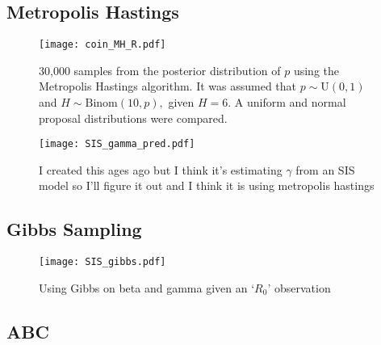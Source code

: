 \subsection*{Metropolis Hastings}

\begin{figure}[htbp]
    \centering
    \texttt{[image: coin\_MH\_R.pdf]}
    \caption{30,000 samples from the posterior distribution of $p$ using the Metropolis Hastings algorithm. It was assumed that $p\sim \mathrm{U}(0,1)$ and $H \sim \mathrm{Binom}(10, p),$ given $H = 6.$ A uniform and normal proposal distributions were compared.}
    \label{fig:coin_R}
\end{figure}

\begin{figure}[htbp]
    \centering
    \texttt{[image: SIS\_gamma\_pred.pdf]}
    \caption{
        I created this ages ago but I think it's estimating
        $\gamma$ from an SIS model so I'll figure it out and I think it is 
        using metropolis hastings
    }
    \label{fig:SIS_MH_R}
\end{figure}

\subsection*{Gibbs Sampling}

\begin{figure}[htbp]
    \centering
    \texttt{[image: SIS\_gibbs.pdf]}
    \caption{Using Gibbs on beta and gamma given an `$R_0$' observation}
    \label{fig:gibbs_R}
\end{figure}

\subsection*{ABC}